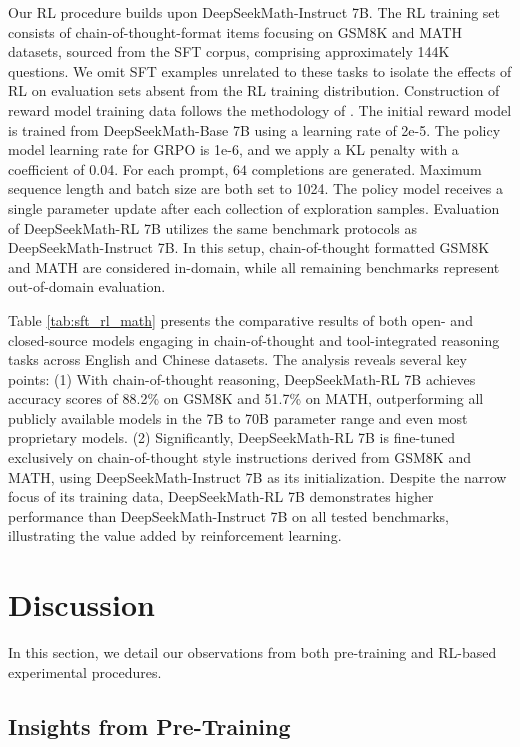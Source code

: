 Our RL procedure builds upon DeepSeekMath-Instruct 7B. The RL training set consists of chain-of-thought-format items focusing on GSM8K and MATH datasets, sourced from the SFT corpus, comprising approximately 144K questions. We omit SFT examples unrelated to these tasks to isolate the effects of RL on evaluation sets absent from the RL training distribution. Construction of reward model training data follows the methodology of \citep{wang2023math}. The initial reward model is trained from DeepSeekMath-Base 7B using a learning rate of 2e-5. The policy model learning rate for GRPO is 1e-6, and we apply a KL penalty with a coefficient of 0.04. For each prompt, $64$ completions are generated. Maximum sequence length and batch size are both set to 1024. The policy model receives a single parameter update after each collection of exploration samples. Evaluation of DeepSeekMath-RL 7B utilizes the same benchmark protocols as DeepSeekMath-Instruct 7B. In this setup, chain-of-thought formatted GSM8K and MATH are considered in-domain, while all remaining benchmarks represent out-of-domain evaluation.

Table \ref{tab:sft_rl_math} presents the comparative results of both open- and closed-source models engaging in chain-of-thought and tool-integrated reasoning tasks across English and Chinese datasets. The analysis reveals several key points: (1) With chain-of-thought reasoning, DeepSeekMath-RL 7B achieves accuracy scores of 88.2\% on GSM8K and 51.7\% on MATH, outperforming all publicly available models in the 7B to 70B parameter range and even most proprietary models. (2) Significantly, DeepSeekMath-RL 7B is fine-tuned exclusively on chain-of-thought style instructions derived from GSM8K and MATH, using DeepSeekMath-Instruct 7B as its initialization. Despite the narrow focus of its training data, DeepSeekMath-RL 7B demonstrates higher performance than DeepSeekMath-Instruct 7B on all tested benchmarks, illustrating the value added by reinforcement learning.

\section{Discussion}
In this section, we detail our observations from both pre-training and RL-based experimental procedures.

\subsection{Insights from Pre-Training}

